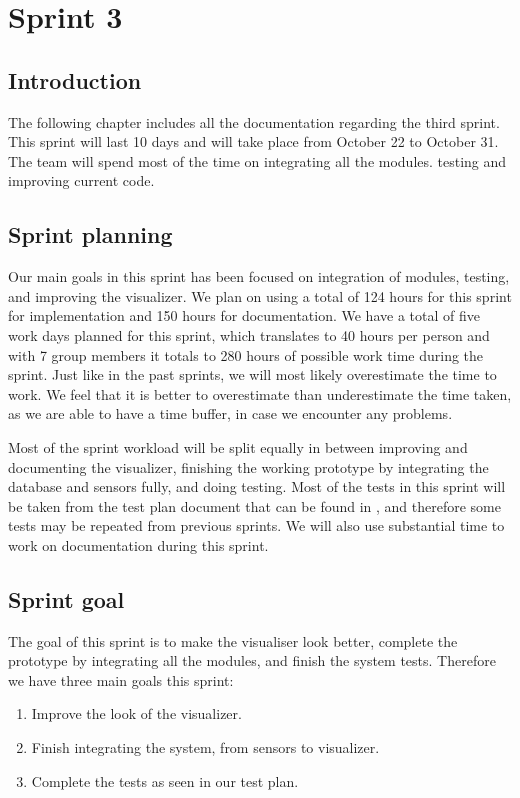 \documentclass[../document]{subfiles}
\begin{document}
\section{Sprint 3}

\subsection{Introduction}
The following chapter includes all the documentation regarding the third sprint. This sprint will last 10 days and will take place from October 22 to October 31. The team will spend most of the time on integrating all the modules. testing and improving current code.

\subsection{Sprint planning}
Our main goals in this sprint has been focused on integration of modules, testing, and improving the visualizer. We plan on using a total of 124 hours for this sprint for implementation and 150 hours for documentation. We have a total of five work days planned for this sprint, which translates to 40 hours per person and with 7 group members it totals to 280 hours of possible work time during the sprint. Just like in the past sprints, we will most likely overestimate the time to work. We feel that it is better to overestimate than underestimate the time taken, as we are able to have a time buffer, in case we encounter any problems.

Most of the sprint workload will be split equally in between improving and documenting the visualizer, finishing the working prototype by integrating the database and sensors fully, and doing testing. Most of the tests in this sprint will be taken from the test plan document that can be found in , and therefore some tests may be repeated from previous sprints. We will also use substantial time to work on documentation during this sprint.

\subsection{Sprint goal}
The goal of this sprint is to make the visualiser look better, complete the prototype by integrating all the modules, and finish the system tests. Therefore we have three main goals this sprint:
\begin{enumerate}
	\item
	Improve the look of the visualizer.
	\item
	Finish integrating the system, from sensors to visualizer.
	\item
	Complete the tests as seen in our test plan.
\end{enumerate}
\end{document}
